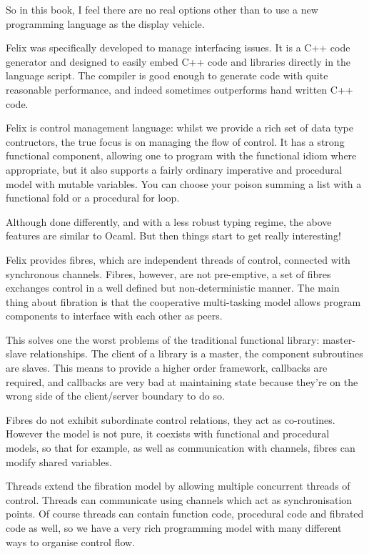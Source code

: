 \documentclass[oneside]{book}
\begin{document}
So in this book, I feel there are no real options other than to
use a new programming language as the display vehicle.

Felix was specifically developed to manage interfacing issues.
It is a C++ code generator and designed to easily embed
C++ code and libraries directly in the language script.
The compiler is good enough to generate code with quite
reasonable performance, and indeed sometimes outperforms
hand written C++ code. 

Felix is control management language: whilst we provide
a rich set of data type contructors, the true focus
is on managing the flow of control. It has a strong functional
component, allowing one to program with the functional
idiom where appropriate, but it also supports a fairly
ordinary imperative and procedural model with mutable
variables. You can choose your poison summing a list
with a functional fold or a procedural for loop.

Although done differently, and with a less robust typing
regime, the above features are similar to Ocaml. But then
things start to get really interesting!

Felix provides fibres, which are independent threads
of control, connected with synchronous channels.
Fibres, however, are not pre-emptive, a set of fibres
exchanges control in a well defined but non-deterministic 
manner. The main thing about fibration is that the cooperative
multi-tasking model allows program components to interface
with each other as peers.

This solves one the worst problems of the traditional
functional library: master-slave relationships.
The client of a library is a master, the component
subroutines are slaves. This means to provide a higher
order framework, callbacks are required, and callbacks
are very bad at maintaining state because they're on
the wrong side of the client/server boundary to do so.

Fibres do not exhibit subordinate control relations,
they act as co-routines. However the model is not pure,
it coexists with functional and procedural models,
so that for example, as well as communication with
channels, fibres can modify shared variables.

Threads extend the fibration model by allowing multiple
concurrent threads of control. Threads can communicate
using channels which act as synchronisation points.
Of course threads can contain function code, procedural
code and fibrated code as well, so we have a very 
rich programming model with many different ways to organise
control flow.
\end{document}
